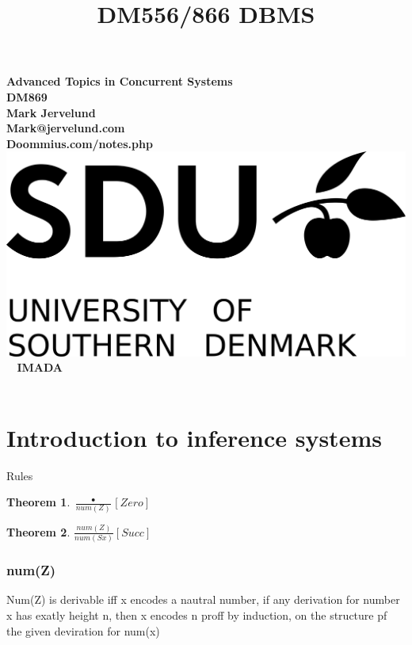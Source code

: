 \documentclass[a4paper,10pt,titlepage]{report}
\date{}
\title{DM556/866 DBMS}
\newtheorem{theorem}{Theorem}
\begin{document}
\begin{titlepage}
\centering
    \vspace*{9\baselineskip}
    \huge
    \bfseries
     Advanced Topics in Concurrent Systems \\ DM869 \\
    \normalfont 
    Mark Jervelund  \\
    Mark@jervelund.com\\
    Doommius.com/notes.php 	\\
    \vspace*{9\baselineskip}
    \normalfont
	\includegraphics[scale=1]{SDU_logo}
    \vfill\ 
    \vspace{5mm}
    IMADA \\

    \textbf{\datedate} \\[2\baselineskip]
\end{titlepage}

\renewcommand{\thepage}{\roman{page}}%
\tableofcontents
\newpage
\setcounter{page}{1}
\renewcommand{\thepage}{\arabic{page}}
\section{Introduction to inference systems}

Rules

\begin{theorem}

$\frac{•}{num(Z)}[Zero]$

\end{theorem}

\begin{theorem}

$\frac{num(Z)}{num(Sx)}[Succ]$

\end{theorem}
\subsubsection{num(Z)}
Num(Z) is derivable iff x encodes a nautral number, if any derivation for number x has exatly height n, then x encodes n
proff by induction, on the structure pf the given deviration for num(x)
\end{document}
